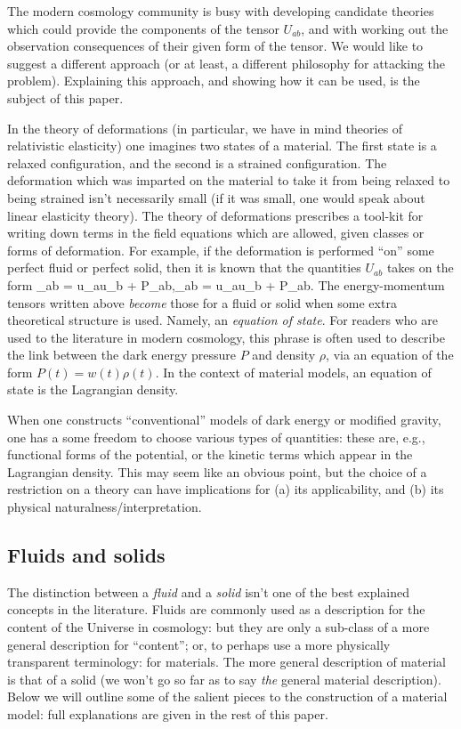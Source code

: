 The modern cosmology community is busy with developing candidate theories which could provide the components of the tensor $U_{ab}$, and with working out the observation consequences of their given form of the tensor.  We would like to suggest a different approach (or at least, a different philosophy for attacking the problem). Explaining this approach, and showing how it can be used, is the subject of this paper.

In the theory of deformations (in particular, we have in mind   theories of relativistic elasticity) one imagines two states of a material. The first state is a relaxed configuration, and the second is a strained configuration. The deformation which was imparted on the material to take it from being relaxed to being strained isn't necessarily small (if it was small, one would  speak about linear elasticity theory). The theory of deformations prescribes a tool-kit for writing down terms in the field equations which are allowed, given classes or forms of deformation. For example, if the deformation is performed ``on'' some perfect fluid or perfect solid, then it is known that the quantities $U_{ab}$ takes on the form
\bea
{}_{ab} = \rho u_au_b + P\gamma_{ab},\qquad {}_{ab} = \rho u_au_b + P_{ab}.
\eea
The energy-momentum tensors written above \textit{become} those for a fluid or solid when some extra theoretical structure is used. Namely, an \textit{equation of state}. For readers who are used to the literature in modern cosmology, this phrase is often used to describe the link between the dark energy pressure $P$ and density $\rho$, via an equation of the form $P(t) = w(t) \rho(t)$. In the context of material models, an equation of state is the Lagrangian density.

When one constructs ``conventional'' models of dark energy or modified gravity, one has a some freedom to choose various types of quantities: these are, e.g., functional forms of the potential, or the kinetic terms which appear in the Lagrangian density. This may seem like an obvious point, but the choice of a restriction on a theory can have implications for (a) its applicability, and (b) its physical naturalness/interpretation. 

\subsection{Fluids and solids}
The distinction between a \textit{fluid} and a \textit{solid} isn't one of the best explained concepts in the literature. Fluids are commonly used as a   description for the content of the Universe in cosmology: but they are only a sub-class of a more general description for ``content''; or, to perhaps use a  more physically transparent terminology: for materials. The more general  description of material is that of a solid (we won't go so far as to say \textit{the}  general material description). Below we will outline some of the salient pieces to the construction of a material model: full explanations are given in the rest of this paper.

